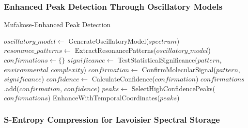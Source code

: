 \documentclass[12pt,a4paper]{article}
\begin{document}
\subsubsection{Enhanced Peak Detection Through Oscillatory Models}

\begin{algorithm}
\caption{Mufakose-Enhanced Peak Detection}
\begin{algorithmic}
    \State $oscillatory\_model \gets$ GenerateOscillatoryModel($spectrum$)
    \State $resonance\_patterns \gets$ ExtractResonancePatterns($oscillatory\_model$)
    \State $confirmations \gets \{\}$
        \State $significance \gets$ TestStatisticalSignificance($pattern$, $environmental\_complexity$)
        \State $confirmation \gets$ ConfirmMolecularSignal($pattern$, $significance$)
        \State $confidence \gets$ CalculateConfidence($confirmation$)
        \State $confirmations$.add($confirmation$, $confidence$)
    \EndFor
    \State $peaks \gets$ SelectHighConfidencePeaks($confirmations$)
    \State \Return EnhanceWithTemporalCoordinates($peaks$)
\EndProcedure
\end{algorithmic}
\end{algorithm}

\subsubsection{S-Entropy Compression for Lavoisier Spectral Storage}
\end{document}
